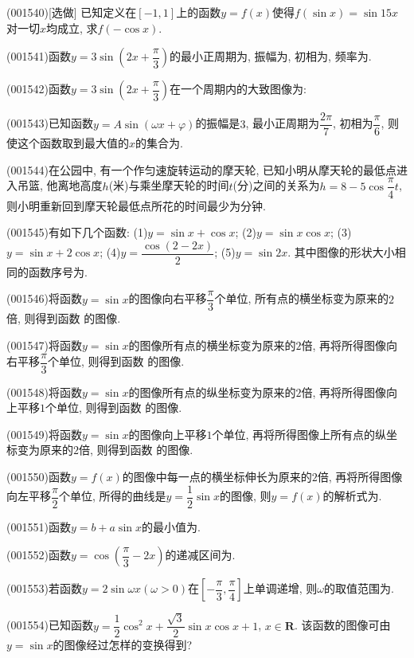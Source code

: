 \item (001540)[选做]
已知定义在$[-1,1]$上的函数$y=f(x)$使得$f(\sin x)=\sin 15x$对一切$x$均成立, 求$f(-\cos x)$.
\item (001541)函数$y=3\sin(2x+\dfrac{\pi}{3})$的最小正周期为, 振幅为, 初相为, 频率为.
\item (001542)函数$y=3\sin(2x+\dfrac{\pi}{3})$在一个周期内的大致图像为:
\item (001543)已知函数$y=A\sin(\omega x+\varphi)$的振幅是$3$, 最小正周期为$\dfrac{2\pi}{7}$,
初相为$\dfrac{\pi}{6}$, 则使这个函数取到最大值的$x$的集合为.
\item (001544)在公园中, 有一个作匀速旋转运动的摩天轮, 已知小明从摩天轮的最低点进入吊篮, 他离地高度$h$(米)与乘坐摩天轮的时间$t$(分)之间的关系为$h=8-5\cos\dfrac{\pi}{4}t$, 则小明重新回到摩天轮最低点所花的时间最少为分钟.
\item (001545)有如下几个函数: (1)$y=\sin x+\cos x$; (2)$y=\sin x\cos x$; (3)$y=\sin x+2\cos x$; (4)$y=\dfrac{\cos(2-2x) }{2}$; (5)$y=\sin 2x$. 其中图像的形状大小相同的函数序号为.
\item (001546)将函数$y=\sin x$的图像向右平移$\dfrac{\pi}{3}$个单位, 所有点的横坐标变为原来的$2$倍, 则得到函数
的图像.
\item (001547)将函数$y=\sin x$的图像所有点的横坐标变为原来的$2$倍, 再将所得图像向右平移$\dfrac{\pi}{3}$个单位, 则得到函数
的图像.
\item (001548)将函数$y=\sin x$的图像所有点的纵坐标变为原来的$2$倍, 再将所得图像向上平移$1$个单位, 则得到函数
的图像.
\item (001549)将函数$y=\sin x$的图像向上平移$1$个单位, 再将所得图像上所有点的纵坐标变为原来的$2$倍, 则得到函数
的图像.
\item (001550)函数$y=f(x)$的图像中每一点的横坐标伸长为原来的$2$倍, 再将所得图像向左平移$\dfrac{\pi}2$个单位, 所得的曲线是$y=\dfrac{1}{2}\sin x$的图像, 则$y=f(x)$的解析式为.
\item (001551)函数$y=b+a\sin x$的最小值为.
\item (001552)函数$y=\cos (\dfrac{\pi}{3}-2x)$的递减区间为.
\item (001553)若函数$y=2\sin\omega x(\omega>0)$在$[-\dfrac{\pi}{3},\dfrac{\pi}{4}]$上单调递增, 则$\omega$的取值范围为.
\item (001554)已知函数$y=\dfrac{1}{2}\cos^2 x+\dfrac{\sqrt{3}}{2}\sin x \cos x+1$, $x \in \mathbf{R}$.
该函数的图像可由$y=\sin x$的图像经过怎样的变换得到?
